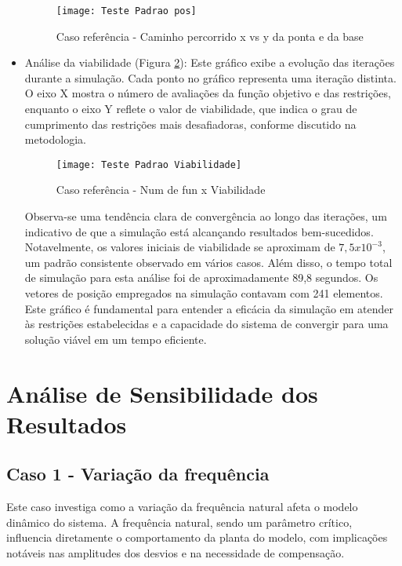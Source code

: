 \begin{itemize}
    \begin{figure}[H]
        \begin{center}
        \caption{Caso referência - Caminho percorrido x vs y da ponta e da base}
        \texttt{[image: Teste Padrao pos]}
        \label{fig:t_padr_pos}
        \end{center}
    \end{figure}

    \item Análise da viabilidade (Figura \ref{fig:t_padr_viab}): Este gráfico exibe a evolução das iterações durante a simulação. Cada ponto no gráfico representa uma iteração distinta. O eixo X mostra o número de avaliações da função objetivo e das restrições, enquanto o eixo Y reflete o valor de viabilidade, que indica o grau de cumprimento das restrições mais desafiadoras, conforme discutido na metodologia.
    
    \begin{figure}[H]
        \begin{center}
        \caption{Caso referência - Num de fun x Viabilidade}
        \texttt{[image: Teste Padrao Viabilidade]}
        \label{fig:t_padr_viab}
        \end{center}
    \end{figure}

    Observa-se uma tendência clara de convergência ao longo das iterações, um indicativo de que a simulação está alcançando resultados bem-sucedidos. Notavelmente, os valores iniciais de viabilidade se aproximam de $7,5x10^{-3}$, um padrão consistente observado em vários casos.
    Além disso, o tempo total de simulação para esta análise foi de aproximadamente 89,8 segundos. Os vetores de posição empregados na simulação contavam com 241 elementos.
    Este gráfico é fundamental para entender a eficácia da simulação em atender às restrições estabelecidas e a capacidade do sistema de convergir para uma solução viável em um tempo eficiente.
\end{itemize}

\section{Análise de Sensibilidade dos Resultados}
\subsection{Caso 1 - Variação da frequência}
Este caso investiga como a variação da frequência natural afeta o modelo dinâmico do sistema. A frequência natural, sendo um parâmetro crítico, influencia diretamente o comportamento da planta do modelo, com implicações notáveis nas amplitudes dos desvios e na necessidade de compensação.

